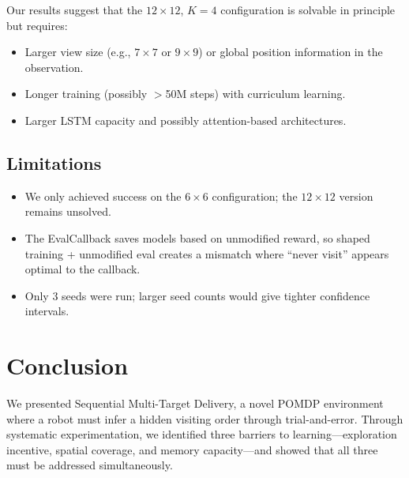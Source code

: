 \documentclass[11pt,a4paper]{article}
\begin{document}
Our results suggest that the $12\times12$, $K=4$ configuration is solvable
in principle but requires:
\begin{itemize}[nosep]
  \item Larger view size (e.g., $7\times7$ or $9\times9$) or global
        position information in the observation.
  \item Longer training (possibly $>$50M steps) with curriculum learning.
  \item Larger LSTM capacity and possibly attention-based architectures.
\end{itemize}

\subsection{Limitations}

\begin{itemize}[nosep]
  \item We only achieved success on the $6\times6$ configuration; the
        $12\times12$ version remains unsolved.
  \item The EvalCallback saves models based on unmodified reward, so
        shaped training + unmodified eval creates a mismatch where
        ``never visit'' appears optimal to the callback.
  \item Only 3 seeds were run; larger seed counts would give tighter
        confidence intervals.
\end{itemize}

\section{Conclusion}

We presented Sequential Multi-Target Delivery, a novel POMDP environment where
a robot must infer a hidden visiting order through trial-and-error. Through
systematic experimentation, we identified three barriers to learning---exploration
incentive, spatial coverage, and memory capacity---and showed that all three
must be addressed simultaneously.
\end{document}

